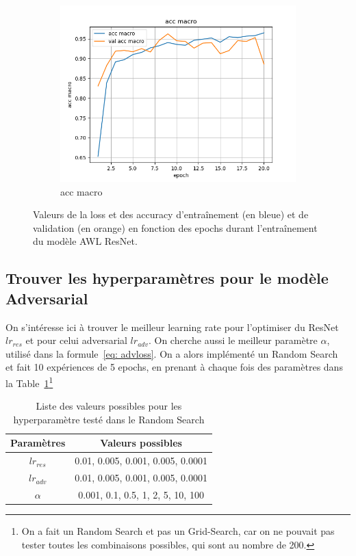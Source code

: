 \documentclass[a4paper]{article}
\begin{document}
\begin{figure}[ht]
\begin{subfigure}{0.32\textwidth}
        \includegraphics[width=\linewidth]{../logs/resnet_allw_img256_2/acc macro.png}
        \caption{acc macro}
    \end{subfigure}
    \caption{Valeurs de la loss et des accuracy d'entraînement (en bleue) et de validation (en orange) en fonction des epochs durant l'entraînement du modèle AWL ResNet.}
    \label{fig: train AWL ResNet}
\end{figure}

\subsection{Trouver les hyperparamètres pour le modèle Adversarial}
\label{sec: random search}
On s'intéresse ici à trouver le meilleur learning rate pour l'optimiser du ResNet $lr_{res}$ et pour celui adversarial $lr_{adv}$. On cherche aussi le meilleur paramètre $\alpha$, utilisé dans la formule~\ref{eq: advloss}. On a alors implémenté un Random Search~\cite{randomsearch} et fait 10 expériences de 5 epochs, en prenant à chaque fois des paramètres dans la Table~\ref{tab:random search possibilities}\footnote{On a fait un Random Search et pas un Grid-Search, car on ne pouvait pas tester toutes les combinaisons possibles, qui sont au nombre de 200.}

\begin{table}
    \centering
    \begin{tabular}{cc}
        \toprule
        Paramètres & Valeurs possibles\\
        \midrule
        $lr_{res}$ & 0.01, 0.005, 0.001, 0.005, 0.0001\\
        $lr_{adv}$ & 0.01, 0.005, 0.001, 0.005, 0.0001\\
        $\alpha$ & 0.001, 0.1, 0.5, 1, 2, 5, 10, 100\\
        \bottomrule
    \end{tabular}
    \caption{Liste des valeurs possibles pour les hyperparamètre testé dans le Random Search}
    \label{tab:random search possibilities}
\end{table}
\end{document}
